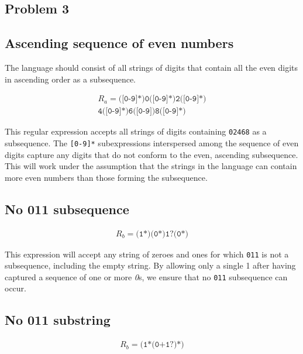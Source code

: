 \documentclass[twoside]{article}
\begin{document}
\begin{multicols}{2}
\section{Problem 3}

\subsection{Ascending sequence of even numbers}

The language should consist of all strings of digits that contain all the even digits in ascending order as a subsequence.


\begin{equation}
\begin{split}
    R_a = \texttt{([0-9]*)0([0-9]*)2([0-9]*)} \\
          \texttt{4([0-9]*)6([0-9])8([0-9]*)}
\end{split}
\end{equation}


This regular expression accepts all strings of digits containing \texttt{02468} as a subsequence. The \texttt{[0-9]*} subexpressions interspersed among the sequence of even digits capture any digits that do not conform to the even, ascending subsequence. This will work under the assumption that the strings in the language can contain more even numbers than those forming the subsequence.


\subsection{No 011 subsequence}

\begin{equation}
\begin{split}
    R_b = \texttt{(1*)(0*)1?(0*)}
\end{split}
\end{equation}

This expression will accept any string of zeroes and ones for which \texttt{011} is not a subsequence, including the empty string.
By allowing only a single 1 after having captured a sequence of one or more \textit{0}s, we ensure that no \texttt{011} subsequence can occur.

\subsection{No 011 substring}

\begin{equation}
\begin{split}
    R_b = \texttt{(1*(0+1?)*)}
\end{split}
\end{equation}


\end{multicols}
\end{document}
